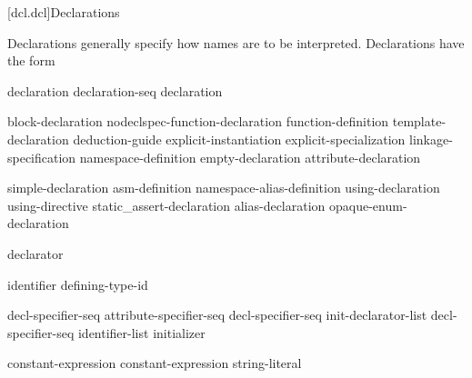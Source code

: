 [dcl.dcl]{Declarations}%



\pnum
Declarations generally specify how names are to be interpreted. Declarations have
the form

\begin{bnf}
\br
    declaration\br
    declaration-seq declaration
\end{bnf}

\begin{bnf}
\br
    block-declaration\br
    nodeclspec-function-declaration\br
    function-definition\br
    template-declaration\br
    deduction-guide\br
    explicit-instantiation\br
    explicit-specialization\br
    linkage-specification\br
    namespace-definition\br
    empty-declaration\br
    attribute-declaration
\end{bnf}

\begin{bnf}
\br
    simple-declaration\br
    asm-definition\br
    namespace-alias-definition\br
    using-declaration\br
    using-directive\br
    static_assert-declaration\br
    alias-declaration\br
    opaque-enum-declaration
\end{bnf}

\begin{bnf}
\br
     declarator \terminal{;}
\end{bnf}

\begin{bnf}
\br
     identifier  \terminal{=} defining-type-id \terminal{;}
\end{bnf}

\begin{bnf}
\br
    decl-specifier-seq  \terminal{;}\br
    attribute-specifier-seq decl-specifier-seq init-declarator-list \terminal{;}\br
     decl-specifier-seq  \terminal{[} identifier-list \terminal{]} initializer \terminal{;}
\end{bnf}

\begin{bnf}
\br
   \terminal{(} constant-expression \terminal{)} \terminal{;}\br
   \terminal{(} constant-expression \terminal{,} string-literal \terminal{)} \terminal{;}
\end{bnf}

